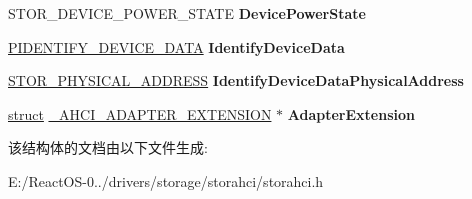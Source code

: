 \begin{DoxyCompactItemize}
\mbox{\label{struct___a_h_c_i___p_o_r_t___e_x_t_e_n_s_i_o_n_aaa4d3524787c4540f4f8c48ea9a05d22}} 
S\+T\+O\+R\+\_\+\+D\+E\+V\+I\+C\+E\+\_\+\+P\+O\+W\+E\+R\+\_\+\+S\+T\+A\+TE {\bfseries Device\+Power\+State}
\item 
\mbox{\label{struct___a_h_c_i___p_o_r_t___e_x_t_e_n_s_i_o_n_a6d9134a58ce86907729143b5632e08d7}} 
\hyperlink{struct___i_d_e_n_t_i_f_y___d_e_v_i_c_e___d_a_t_a}{P\+I\+D\+E\+N\+T\+I\+F\+Y\+\_\+\+D\+E\+V\+I\+C\+E\+\_\+\+D\+A\+TA} {\bfseries Identify\+Device\+Data}
\item 
\mbox{\label{struct___a_h_c_i___p_o_r_t___e_x_t_e_n_s_i_o_n_a830f3df80a3ab416deca830e8587e3ac}} 
\hyperlink{union___l_a_r_g_e___i_n_t_e_g_e_r}{S\+T\+O\+R\+\_\+\+P\+H\+Y\+S\+I\+C\+A\+L\+\_\+\+A\+D\+D\+R\+E\+SS} {\bfseries Identify\+Device\+Data\+Physical\+Address}
\item 
\mbox{\label{struct___a_h_c_i___p_o_r_t___e_x_t_e_n_s_i_o_n_a324eec440bd02d99396e79a921c5a035}} 
\hyperlink{interfacestruct}{struct} \hyperlink{struct___a_h_c_i___a_d_a_p_t_e_r___e_x_t_e_n_s_i_o_n}{\+\_\+\+A\+H\+C\+I\+\_\+\+A\+D\+A\+P\+T\+E\+R\+\_\+\+E\+X\+T\+E\+N\+S\+I\+ON} $\ast$ {\bfseries Adapter\+Extension}
\end{DoxyCompactItemize}


该结构体的文档由以下文件生成\+:\begin{DoxyCompactItemize}
\item 
E\+:/\+React\+O\+S-\/0../drivers/storage/storahci/storahci.\+h\end{DoxyCompactItemize}
